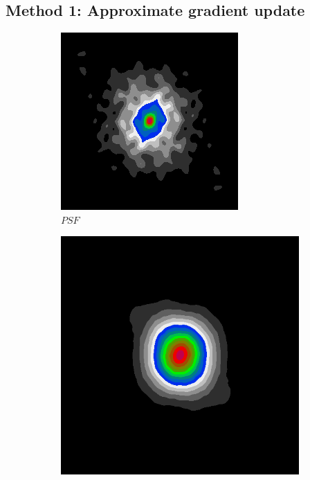 \subsection{Method 1: Approximate gradient update}
\begin{figure}[h]
	\centering
	\begin{subfigure}[b]{0.245\linewidth}
		\includegraphics[width=\linewidth]{./chapters/03.distribution/simulated/psf.png}
		\caption{$PSF$}
	\end{subfigure}
	\begin{subfigure}[b]{0.245\linewidth}
		\includegraphics[width=\linewidth]{./chapters/03.distribution/simulated/psf2.png}

\end{subfigure}
\end{figure}
